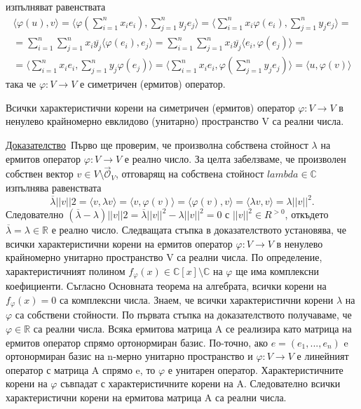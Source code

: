 \documentclass{article}
\newcommand*{\nullvec}{\vec{\mathcal{O}}}
\newcommand*{\bC}{\mathbb{C}}
\newcommand*{\bR}{\mathbb{R}}
\newcommand*{\ska}[2]{\langle #1, #2 \rangle}
\newcommand{\dok}{\underline{Доказателство}\  }
\newcommand{\tvurdenie}[2]{
    \begin{tcolorbox}[title = #1 ,colframe = blue!70!black, colback = blue!10!white]
        #2
    \end{tcolorbox}
}
\begin{document}
изпълняват равенствата
\begin{gather*}
    \ska{\varphi(u)}{v}=\ska{\varphi\left(\sum^n_{i=1}x_ie_i\right)}{\sum^n_{j=1}y_je_j}
    =\ska{\sum^n_{i=1}x_i\varphi(e_i)}{\sum^n_{j=1}y_je_j}=\\
    =\sum_{i=1}^{n}\sum_{j=1}^{n}x_i\overline{y_j}\ska{\varphi(e_i)}{e_j}
    =\sum_{i=1}^{n}\sum_{j=1}^{n}x_i\overline{y_j}\ska{e_i}{\varphi(e_j)}=\\
    =\ska{\sum^n_{i=1}x_ie_i}{\sum^n_{j=1}y_j\varphi(e_j)}
    =\ska{\sum^n_{i=1}x_ie_i}{\varphi\left(\sum^n_{j=1}y_je_j\right)}=\ska{u}{\varphi(v)}
\end{gather*}
така че $\varphi : V \rightarrow V$ е симетричен (ермитов) оператор.

\tvurdenie{Твърдение 22.5}{
    Всички характеристични корени на симетричен (ермитов) оператор $\varphi : V \rightarrow V$
    в ненулево крайномерно евклидово (унитарно) пространство V са реални числа.
}

\dok Първо ще проверим, че произволна собствена стойност
$\lambda$ на ермитов оператор $\varphi : V \rightarrow V$ е реално число. За целта забелзваме,
че произволен собствен вектор $v \in V \setminus {\nullvec_V}$, отговарящ на собствена
стойност $lambda \in \bC$ изпълнява равенствата
\[
    \overline\lambda||v||2 = \ska{v}{\lambda v} = \ska{v}{\varphi(v)} = \ska{\varphi(v)}{v} =
    \ska{\lambda v}{v}= \lambda {||v||}^2 .
\]
Следователно $(\overline\lambda-\lambda){||v||}2 = \overline\lambda{||v||}^2-\lambda{||v||}^2 = 0$
с ${||v||}^2 \in R^{>0}$, откъдето $\overline\lambda = \lambda\in \bR$ е реално число.
Следващата стъпка в доказателството установява, че всички характеристични корени на ермитов оператор
$\varphi : V \rightarrow V$ в ненулево крайномерно унитарно пространство V са реални числа. По определение,
характеристичният полином
$f_\varphi(x) \in \bC[x] \setminus \bC$ на $\varphi$ ще има комплексни коефициенти. Съгласно
Основната теорема на алгебрата, всички корени на $f_\varphi(x) = 0$ са комплексни
числа. Знаем, че всички характеристични корени $\lambda$ на $\varphi$ са собствени стойности.
По първата стъпка на доказателството получаваме, че $\varphi \in \bR$ са реални числа.
Всяка ермитова матрица A се реализира като матрица на ермитов оператор
спрямо ортонормиран базис. По-точно, ако $e = (e_1, . . . , e_n)$ e ортонормиран базис на
n-мерно унитарно пространство и $\varphi : V \rightarrow V$ е линейният оператор
с матрица A спрямо e, то $\varphi$ е унитарен оператор.
Характеристичните корени на $\varphi$ съвпадат с характеристичните корени на A.
Следователно всички характеристични корени на ермитова матрица A са реални числа.
\end{document}
